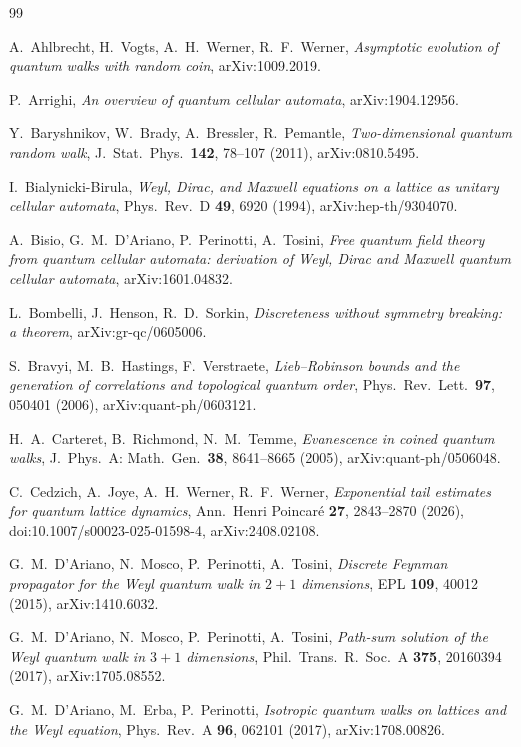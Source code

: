 \documentclass[11pt]{amsart}
\theoremstyle{definition}
\theoremstyle{remark}
\begin{document}
\begin{thebibliography}{99}

A.~Ahlbrecht, H.~Vogts, A.~H.~Werner, R.~F.~Werner,
\emph{Asymptotic evolution of quantum walks with random coin},
arXiv:1009.2019.

P.~Arrighi,
\emph{An overview of quantum cellular automata},
arXiv:1904.12956.

Y.~Baryshnikov, W.~Brady, A.~Bressler, R.~Pemantle,
\emph{Two-dimensional quantum random walk},
J.\ Stat.\ Phys.\ \textbf{142}, 78--107 (2011), arXiv:0810.5495.

I.~Bialynicki-Birula,
\emph{Weyl, Dirac, and Maxwell equations on a lattice as unitary cellular automata},
Phys.\ Rev.\ D \textbf{49}, 6920 (1994), arXiv:hep-th/9304070.

A.~Bisio, G.~M.~D'Ariano, P.~Perinotti, A.~Tosini,
\emph{Free quantum field theory from quantum cellular automata: derivation of Weyl, Dirac and Maxwell quantum cellular automata},
arXiv:1601.04832.

L.~Bombelli, J.~Henson, R.~D.~Sorkin,
\emph{Discreteness without symmetry breaking: a theorem},
arXiv:gr-qc/0605006.

S.~Bravyi, M.~B.~Hastings, F.~Verstraete,
\emph{Lieb--Robinson bounds and the generation of correlations and topological quantum order},
Phys.\ Rev.\ Lett.\ \textbf{97}, 050401 (2006), arXiv:quant-ph/0603121.

H.~A.~Carteret, B.~Richmond, N.~M.~Temme,
\emph{Evanescence in coined quantum walks},
J.\ Phys.\ A: Math.\ Gen.\ \textbf{38}, 8641--8665 (2005), arXiv:quant-ph/0506048.

C.~Cedzich, A.~Joye, A.~H.~Werner, R.~F.~Werner,
\emph{Exponential tail estimates for quantum lattice dynamics},
Ann.\ Henri Poincar\'e \textbf{27}, 2843--2870 (2026), doi:10.1007/s00023-025-01598-4, arXiv:2408.02108.

G.~M.~D'Ariano, N.~Mosco, P.~Perinotti, A.~Tosini,
\emph{Discrete Feynman propagator for the Weyl quantum walk in $2+1$ dimensions},
EPL \textbf{109}, 40012 (2015), arXiv:1410.6032.

G.~M.~D'Ariano, N.~Mosco, P.~Perinotti, A.~Tosini,
\emph{Path-sum solution of the Weyl quantum walk in $3+1$ dimensions},
Phil.\ Trans.\ R.\ Soc.\ A \textbf{375}, 20160394 (2017), arXiv:1705.08552.

G.~M.~D'Ariano, M.~Erba, P.~Perinotti,
\emph{Isotropic quantum walks on lattices and the Weyl equation},
Phys.\ Rev.\ A \textbf{96}, 062101 (2017), arXiv:1708.00826.


\end{thebibliography}
\end{document}
